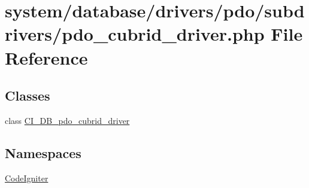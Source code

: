 \hypertarget{pdo__cubrid__driver_8php}{}\section{system/database/drivers/pdo/subdrivers/pdo\+\_\+cubrid\+\_\+driver.php File Reference}
\label{pdo__cubrid__driver_8php}
\subsection*{Classes}
\begin{DoxyCompactItemize}
\item 
class \mbox{\hyperlink{class_c_i___d_b__pdo__cubrid__driver}{C\+I\+\_\+\+D\+B\+\_\+pdo\+\_\+cubrid\+\_\+driver}}
\end{DoxyCompactItemize}
\subsection*{Namespaces}
\begin{DoxyCompactItemize}
\item 
 \mbox{\hyperlink{namespace_code_igniter}{Code\+Igniter}}
\end{DoxyCompactItemize}
